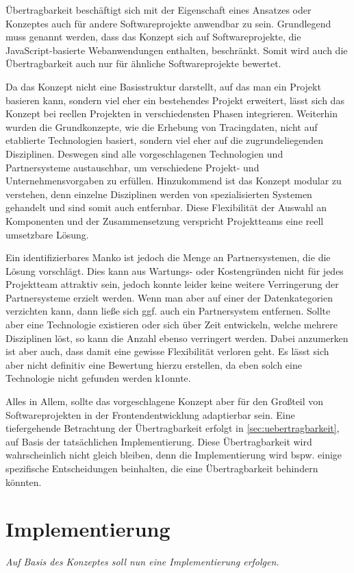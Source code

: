 	Übertragbarkeit beschäftigt sich mit der Eigenschaft eines Ansatzes oder Konzeptes auch für andere Softwareprojekte anwendbar zu sein. Grundlegend muss genannt werden, dass das Konzept sich auf Softwareprojekte, die JavaScript-basierte Webanwendungen enthalten, beschränkt. Somit wird auch die Übertragbarkeit auch nur für ähnliche Softwareprojekte bewertet.
	
	Da das Konzept nicht eine Basisstruktur darstellt, auf das man ein Projekt basieren kann, sondern viel eher ein bestehendes Projekt erweitert, lässt sich das Konzept bei reellen Projekten in verschiedensten Phasen integrieren. Weiterhin wurden die Grundkonzepte, wie die Erhebung von Tracingdaten, nicht auf etablierte Technologien basiert, sondern viel eher auf die zugrundeliegenden Disziplinen. Deswegen sind alle vorgeschlagenen Technologien und Partnersysteme austauschbar, um verschiedene Projekt- und Unternehmensvorgaben zu erfüllen. Hinzukommend ist das Konzept modular zu verstehen, denn einzelne Disziplinen werden von spezialisierten Systemen gehandelt und sind somit auch entfernbar. Diese Flexibilität der Auswahl an Komponenten und der Zusammensetzung verspricht Projektteams eine reell umsetzbare Lösung.

	Ein identifizierbares Manko ist jedoch die Menge an Partnersystemen, die die Lösung vorschlägt. Dies kann aus Wartungs- oder Kostengründen nicht für jedes Projektteam attraktiv sein, jedoch konnte leider keine weitere Verringerung der Partnersysteme erzielt werden. Wenn man aber auf einer der Datenkategorien verzichten kann, dann ließe sich ggf. auch ein Partnersystem entfernen. Sollte aber eine Technologie existieren oder sich über Zeit entwickeln, welche mehrere Disziplinen löst, so kann die Anzahl ebenso verringert werden. Dabei anzumerken ist aber auch, dass damit eine gewisse Flexibilität verloren geht. Es lässt sich aber nicht definitiv eine Bewertung hierzu erstellen, da eben solch eine Technologie nicht gefunden werden k1onnte.
	
	Alles in Allem, sollte das vorgeschlagene Konzept aber für den Großteil von Softwareprojekten in der Frontendentwicklung adaptierbar sein. Eine tiefergehende Betrachtung der Übertragbarkeit erfolgt in \autoref{sec:uebertragbarkeit}, auf Basis der tatsächlichen Implementierung. Diese Übertragbarkeit wird wahrscheinlich nicht gleich bleiben, denn die Implementierung wird bspw. einige spezifische Entscheidungen beinhalten, die eine Übertragbarkeit behindern könnten.

\section{Implementierung}

	\textit{Auf Basis des Konzeptes soll nun eine Implementierung erfolgen.}